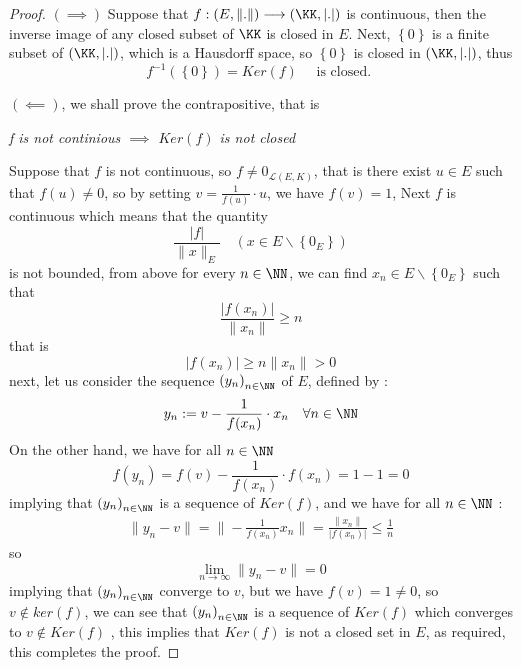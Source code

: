\begin{proof}
$ \left( \implies  \right) $  Suppose that 
$ f : \left( E,\| . \|  \right) \longrightarrow \left( \KK,\left| . \right| \right) $ 
is continuous, then the inverse image of any closed subset of $\KK $ is closed in 
$E $. Next, $\left\{ 0 \right\} $ is a finite
subset of $\left( \KK, \left| . \right| \right) $, which is a Hausdorff space,  
so $\left\{ 0 \right\} $ is closed in $\left( \KK, \left| . \right| \right) $, thus 
\[
f^{-1} \left( \left\{ 0 \right\} \right) = Ker (f) 
\quad 
\text{ is closed. } 
\]

$ \left(   \impliedby \right)  $, we shall prove the contrapositive, that is 

\begin{center}
	\it f is not continious $ \implies  $  
	$Ker(f)  $  is not closed \normalfont
\end{center}
Suppose that $f $ is not continuous, so 
$f \neq  0_{\mathcal{L}\left( E,K \right)} $,
that is there exist $u \in E $ such that $f(u) \neq 0 $, so by setting 
$v = \frac{1}{f(u) }\cdot u $, we have 
$f(v) = 1 $, Next $f $ is continuous which means that the quantity 
\[
\frac{\left| f \right|}{\| x \|_{E} }  
\quad 
\left( x \in E \backslash \left\{ 0_{E} \right\} \right)
\]
is not bounded, from above for every $n \in \NN $, we can find 
$x_{n} \in  E \backslash \left\{ 0_{E} \right\} $  such that 
\[
\frac{\left| f(x_{n})  \right|}{\| x_{n} \| } 
\geq n
\]
that is 
\[
\left| f(x_{n})  \right| 
\geq n \| x_{n} \|  > 0
\]
next, let us consider the sequence $\left( y_{n} \right)_{n \in \NN} $  
of $E $, defined by : 
\[
y_{n} := 
v - \frac{1}{f(x_{n}) } \cdot x_{n} \quad 
\forall  n \in \NN
\]
On the other hand, we have for all $n \in \NN $ 
\[
f(y_{n})  = 
f(v)  - \frac{1}{f(x_{n}) } \cdot f(x_{n})  = 1-1 = 0
\]
implying that $\left( y_{n} \right)_{n \in  \NN} $  is a sequence of 
$Ker(f)  $, and we have for all $n \in \NN $  : 
\begin{align*}
\| y_{n} - v \|  =
 \| - \frac{1}{f(x_{n}) }x_{n} \|  = 
 \frac{\| x_{n} \| }{\left| f(x_{n})  \right|} 
 \leq \frac{1}{n} 
\end{align*}
so 
\[
\lim_{n \to \infty} 
\| y_{n} - v \|  = 0
\]
implying that $\left( y_{n} \right)_{n \in \NN} $  converge to $v $, but we have 
$f(v) = 1 \neq 0 $, so $v \notin ker(f)$, we can see that 
$\left( y_{n} \right)_{n \in \NN} $  is a sequence of $Ker \left( f \right) $  
which converges to $v \notin Ker (f)  $ , this implies that 
$Ker(f)  $  is not a closed set in $E $, as required, this completes the proof.
\end{proof}
